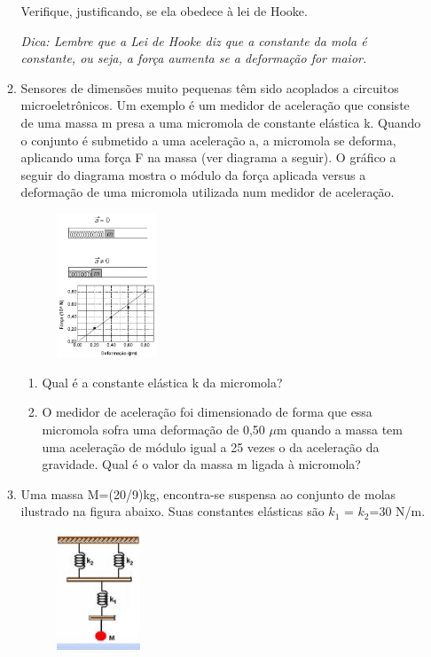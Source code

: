 \documentclass[12pt,letterpaper,fleqn]{article}
\begin{document}
\begin{itemize}
\begin{enumerate}
        Verifique, justificando, se ela obedece à lei de Hooke.
        
        \textit{Dica: Lembre que a Lei de Hooke diz que a constante da mola é constante, ou seja, a força aumenta se a deformação for maior.}
        
        \item Sensores de dimensões muito pequenas têm sido acoplados a circuitos microeletrônicos. Um exemplo é um medidor de aceleração que consiste de uma massa m presa a uma micromola de constante elástica k. Quando o conjunto é submetido a uma aceleração a, a micromola se deforma, aplicando uma força F na massa (ver diagrama a seguir). O gráfico a seguir do diagrama mostra o módulo da força aplicada versus a deformação de uma micromola utilizada num medidor de aceleração.
        
        \begin{figure}[H]
            \centering
            \includegraphics[width=0.3\textwidth]{ex_5.jpg}
        \end{figure}
        
        \begin{enumerate}
            \item Qual é a constante elástica k da micromola?
            \item O medidor de aceleração foi dimensionado de forma que essa micromola sofra uma deformação de 0,50 $\mu$m quando a massa tem uma aceleração de módulo igual a 25 vezes o da aceleração da gravidade. Qual é o valor da massa m ligada à micromola?
        \end{enumerate}
        
        \item Uma massa M=(20/9)kg, encontra-se suspensa ao conjunto de molas ilustrado na figura abaixo. Suas constantes elásticas são $k_1$ = $k_2$=30 N/m.
        
        \begin{figure}[h]
            \centering
            \includegraphics[width=0.25\textwidth]{ex_6.jpg}
        \end{figure}
        

\end{enumerate}
\end{itemize}
\end{document}
